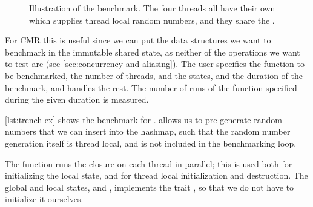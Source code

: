 \begin{figure}[ht]
  
  \caption{Illustration of the  benchmark. The four threads all have their own
   which supplies thread local random numbers, and they share the
  .}
\end{figure}

For CMR this is useful since we can put the data structures we want to
benchmark in the immutable shared state, as neither of the operations we want to test are
 (see \cref{sec:concurrency-and-aliasing}). The user specifies the function to be
benchmarked, the number of threads, and the states, and the duration of the benchmark, and
 handles the rest. The number of runs of the function specified during the given
duration is measured.


\cref{lst:trench-ex} shows the benchmark for .   allows us
to pre-generate random numbers that we can insert into the hashmap, such that the random number
generation itself is thread local, and is not included in the benchmarking loop.

The  function runs the closure on each thread in parallel; this is used both
for initializing the local state, and for thread local initialization and destruction.
The global and local states,  and , implements the trait
, so that we do not have to initialize it ourselves.

